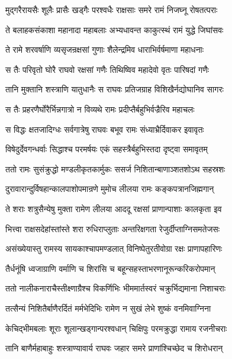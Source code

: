 \twolineshloka
{मुद्गरैरायसैः शूलैः प्रासैः खड्गैः परश्वधैः}
{राक्षसाः समरे रामं निजघ्नू रोषतत्पराः} %

\twolineshloka
{ते बलाहकसंकाशा महानादा महाबलाः}
{अभ्यधावन्त काकुत्स्थं रामं युद्धे जिघांसवः} %

\twolineshloka
{ते रामे शरवर्षाणि व्यसृजन्रक्षसां गुणाः}
{शैलेन्द्रमिव धाराभिर्वर्षमाणा महाधनाः} %

\twolineshloka
{स तैः परिवृतो घोरै राघवो रक्षसां गणैः}
{तिथिष्विव महादेवो वृतः पारिषदां गणैः} %

\twolineshloka
{तानि मुक्तानि शस्त्राणि यातुधानैः स राघवः}
{प्रतिजग्राह विशिखैर्नद्योघानिव सागरः} %

\twolineshloka
{स तैः प्रहरणैर्घोरैर्भिन्नगात्रो न विव्यथे}
{रामः प्रदीप्तैर्बहुभिर्वज्रैरिव महाचलः} %

\twolineshloka
{स विद्धः क्षतजादिग्धः सर्वगात्रेषु राघवः}
{बभूव रामः संध्याभ्रैर्दिवाकर इवावृतः} %

\twolineshloka
{विषेदुर्देवगन्धर्वाः सिद्धाश्च परमर्षयः}
{एकं सहस्त्रैर्बहुभिस्तदा दृष्ट्वा समावृतम्} %

\twolineshloka
{ततो रामः सुसंक्रुद्धो मण्डलीकृतकार्मुकः}
{ससर्ज निशितान्बाणाञ्शतशोऽथ सहस्रशः} %

\twolineshloka
{दुरावारान्दुर्विषहान्कालपाशोपमान्रणे}
{मुमोच लीलया रामः कङ्कपत्रानजिह्मगान्} %

\twolineshloka
{ते शराः शत्रुसैन्येषु मुक्ता रामेण लीलया}
{आददू रक्षसां प्राणान्पाशाः कालकृता इव} %

\twolineshloka
{भित्त्वा राक्षसदेहांस्तांस्ते शरा रुधिराप्लुताः}
{अन्तरिक्षगता रेजुर्दीप्ताग्निसमतेजसः} %

\twolineshloka
{असंख्येयास्तु रामस्य सायकाश्चापमण्डलात्}
{विनिष्पेतुरतीवोग्रा रक्षः प्राणापहारिणः} %

\twolineshloka
{तैर्धनूंषि ध्वजाग्राणि वर्माणि च शिरांसि च}
{बहून्सहस्ताभरणानूरून्करिकरोपमान्} %

\twolineshloka
{ततो नालीकनाराचैस्तीक्ष्णाग्रैश्च विकर्णिभिः}
{भीममार्तस्वरं चक्रुर्भिद्यमाना निशाचराः} %

\twolineshloka
{तत्सैन्यं निशितैर्बाणैरर्दितं मर्मभेदिभिः}
{रामेण न सुखं लेभे शुष्कं वनमिवाग्निना} %

\twolineshloka
{केचिद्भीमबलाः शूराः शूलान्खड्गान्परश्वधान्}
{चिक्षिपुः परमक्रुद्धा रामाय रजनीचराः} %

\twolineshloka
{तानि बाणैर्महाबाहुः शस्त्राण्यावार्य राघवः}
{जहार समरे प्राणांश्चिच्छेद च शिरोधरान्} %

